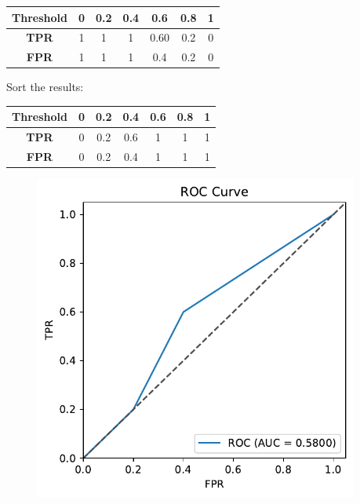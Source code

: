\documentclass[aspectratio=169, 10pt]{beamer}
\begin{document}
\begin{frame}
\begin{columns}
\begin{column}{0.5\textwidth}
        \end{column}
        \begin{column}{0.5\textwidth}
            
            \begin{table}[]
                \begin{tabular}{c|cccccc}
                \textbf{Threshold} & \textbf{0} & \textbf{0.2} & \textbf{0.4} & \textbf{0.6} & \textbf{0.8} & \textbf{1} \\ \hline
                \textbf{TPR}       & 1          & 1            & 1            & 0.60         & 0.2          & 0          \\
                \textbf{FPR}       & 1          & 1            & 1            & 0.4          & 0.2          & 0         
                \end{tabular}
            \end{table}
            
            Sort the results:

            \begin{table}[]
                \begin{tabular}{c|cccccc}
                \textbf{Threshold} & \textbf{0} & \textbf{0.2} & \textbf{0.4} & \textbf{0.6} & \textbf{0.8} & \textbf{1} \\ \hline
                \textbf{TPR}       & 0          & 0.2            & 0.6            & 1         & 1         & 1          \\
                \textbf{FPR}       & 0          & 0.2           & 0.4           & 1          & 1          & 1         
                \end{tabular}
            \end{table}

            \begin{figure}
                \centering
                \includegraphics[width=0.4\columnwidth]{../plots/roc_curve_eg.pdf}
            \end{figure}

        \end{column}
    \end{columns}
\end{frame}
\end{document}
